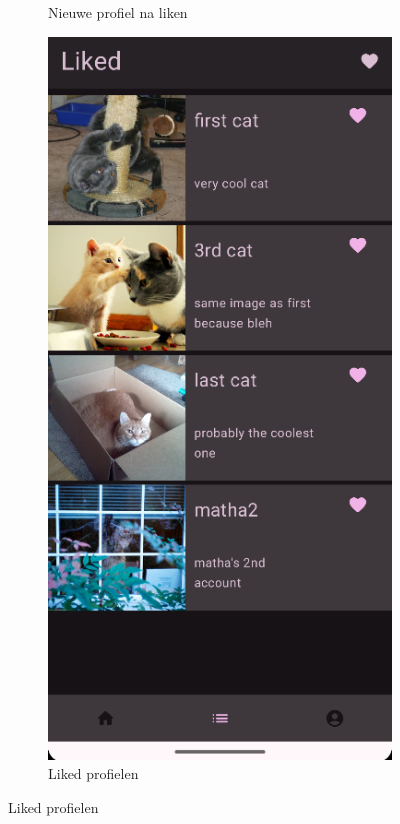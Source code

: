 \documentclass{report}
\begin{document}
\begin{figure}[h]
\begin{subfigure}[b]{0.32\textwidth}
        \caption{Nieuwe profiel na liken}
    \end{subfigure}
    \hfill
    \begin{subfigure}[b]{0.32\textwidth}
        \includegraphics[width=\textwidth]{DEMO_List1.png} 
        \caption{Liked profielen}
    \end{subfigure}


\end{figure}
\end{document}
